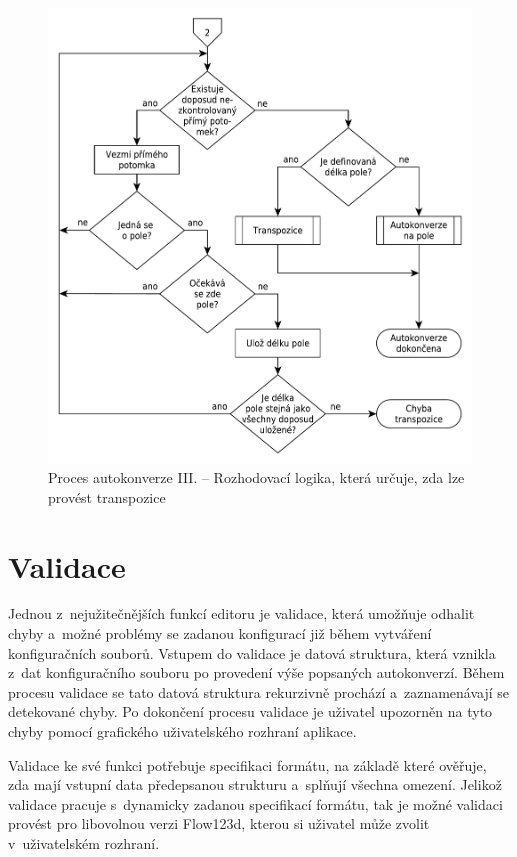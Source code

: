 \documentclass[FM,bw,DP]{tulthesis}
\begin{document}
\begin{figure}[H]
	\centering
    \includegraphics[width=\textwidth]{../img/autoconversion_process_3.pdf}
    \caption[Proces autokonverze III.]{Proces autokonverze III. -- Rozhodovací logika, která určuje, zda lze provést transpozice}
	\label{img:autoconversion_process_3}
\end{figure}

\clearpage

\section{Validace}

Jednou z~nejužitečnějších funkcí editoru je validace, která umožňuje odhalit chyby a~možné problémy se zadanou konfigurací již během vytváření konfiguračních souborů. Vstupem do validace je datová struktura, která vznikla z~dat konfiguračního souboru po provedení výše popsaných autokonverzí. Během procesu validace se tato datová struktura rekurzivně prochází a~zaznamenávají se detekované chyby. Po dokončení procesu validace je uživatel upozorněn na tyto chyby pomocí grafického uživatelského rozhraní aplikace.

Validace ke své funkci potřebuje specifikaci formátu, na základě které ověřuje, zda mají vstupní data předepsanou strukturu a~splňují všechna omezení. Jelikož validace pracuje s~dynamicky zadanou specifikací formátu, tak je možné validaci provést pro libovolnou verzi Flow123d, kterou si uživatel může zvolit v~uživatelském rozhraní.
\end{document}
